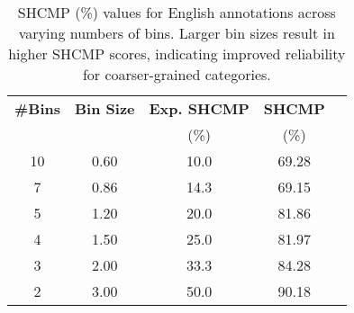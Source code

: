 \begin{table}[t]
  \small
    \centering
    \setlength{\tabcolsep}{4pt} 
    \renewcommand{\arraystretch}{1.1} 
    \begin{tabular}{@{}ccccc@{}}
        \toprule
        \textbf{\#Bins} & \textbf{Bin Size} & \textbf{Exp. SHCMP} & \textbf{SHCMP} \\ 
        & & (\%) & (\%) \\ 
        \midrule
        10 & 0.60 & 10.0 & 69.28 \\ 
         7 & 0.86 & 14.3 & 69.15 \\ 
         5 & 1.20 & 20.0 & 81.86 \\ 
         4 & 1.50 & 25.0 & 81.97 \\ 
         3 & 2.00 & 33.3 & 84.28 \\ 
         2 & 3.00 & 50.0 & 90.18 \\ 
        \bottomrule
    \end{tabular}
    \caption{SHCMP (\%) values for English annotations across varying numbers of bins. Larger bin sizes result in higher SHCMP scores, indicating improved reliability for coarser-grained categories.}
    \label{tab:shcmp-english}
\end{table}
